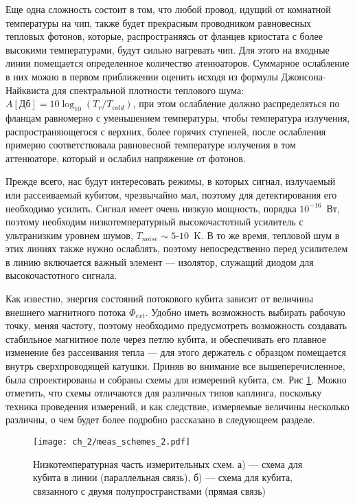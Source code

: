 Еще одна сложность состоит в том, что любой провод, идущий от комнатной температуры на чип, также будет прекрасным проводником равновесных тепловых фотонов, которые, распространяясь от фланцев криостата с более высокими температурами, будут сильно нагревать чип. Для этого на входные линии помещается определенное количество атенюаторов. Суммарное ослабление в них можно в первом приближении оценить исходя из формулы Джонсона-Найквиста для спектральной плотности теплового шума: $A[\text{Дб}]=10\log_{10}(T_r/T_{cold})$, при этом ослабление должно распределяться по фланцам равномерно с уменьшением температуры, чтобы температура излучения, распространяющегося с верхних, более горячих ступеней, после ослабления примерно соответствовала равновесной температуре излучения в том аттенюаторе, который и ослабил напряжение от фотонов.  

Прежде всего, нас будут интересовать режимы, в которых сигнал, излучаемый или рассеиваемый кубитом, чрезвычайно мал, поэтому для детектирования  его необходимо усилить. Сигнал имеет очень низкую мощность, порядка $10^{-16}$~Вт, поэтому необходим низкотемпературный высокочастотный усилитель с ультранизким уровнем шумов, $T_{noise} \sim 5$-$10$~K. В то же время, тепловой шум в этих линиях также нужно ослаблять, поэтому непосредственно перед усилителем в линию включается важный элемент --- изолятор, служащий диодом для высокочастотного сигнала. 

Как известно, энергия состояний потокового кубита зависит от величины внешнего магнитного потока $\Phi_{ext}$. Удобно иметь возможность выбирать рабочую точку, меняя частоту, поэтому необходимо предусмотреть возможность создавать стабильное магнитное поле через петлю кубита, и обеспечивать его плавное изменение без рассеивания тепла --- для этого держатель с образцом помещается внутрь сверхпроводящей катушки. 
Приняв во внимание все вышеперечисленное, была спроектированы и собраны схемы для измерений кубита, см. Рис \ref{fig: schemes}. Можно отметить, что схемы отличаются для различных типов каплинга, поскольку техника проведения измерений, и как следствие, измеряемые величины несколько различны, о чем будет более подробно рассказано в следующеем разделе.

\begin{figure}[htb]\center
	\texttt{[image: ch\_2/meas\_schemes\_2.pdf]} \hfill
	\caption[width=0.6\textwidth]{Низкотемпературная часть измерительных схем. а) --- схема для кубита в линии (параллельная связь), б) --- схема для кубита, связанного с двумя полупространствами (прямая связь) }
	\label{fig: schemes}
\end{figure}

